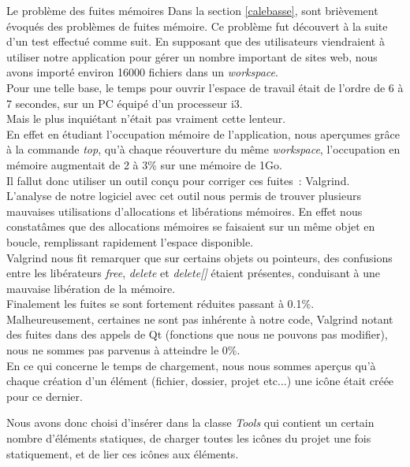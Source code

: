 \documentclass[a4paper, 12pt]{report}
\begin{document}
\begin{chapter}
	\begin{section}{Le problème des fuites mémoires}
		Dans la section \ref{calebasse}, sont brièvement évoqués des problèmes de fuites mémoire. Ce problème fut découvert à la suite
		d'un test effectué comme suit.
		En supposant que des utilisateurs viendraient à utiliser notre application pour gérer un nombre important de sites web, nous avons importé
		environ 16000 fichiers dans un \emph{workspace}.\\
		Pour une telle base, le temps pour ouvrir l'espace de travail était de l'ordre de 6 à 7 secondes, sur un PC équipé d'un processeur i3.\\
		Mais le plus inquiétant n'était pas vraiment cette lenteur.\\
		En effet en étudiant l'occupation mémoire de l'application, nous aperçumes grâce à la commande \emph{top}, qu'à chaque réouverture du même 
		\emph{workspace}, l'occupation en mémoire augmentait de 2 à 3\% sur une mémoire de 1Go.\\


		Il fallut donc utiliser un outil conçu pour corriger ces fuites : \gls{Valgrind}.\\
		L'analyse de notre logiciel avec cet outil nous permis de trouver plusieurs mauvaises utilisations d'allocations et libérations mémoires.
		En effet nous constatâmes que des allocations mémoires se faisaient sur  un même objet en boucle, remplissant rapidement l'espace
		disponible.\\
		\gls{Valgrind} nous fit remarquer que sur certains objets ou pointeurs, des confusions entre les libérateurs \emph{free}, \emph{delete} et
		\emph{delete[]} étaient présentes, conduisant à une mauvaise libération de la mémoire.\\


		Finalement les fuites se sont fortement réduites passant à 0.1\%.\\
		Malheureusement, certaines ne sont pas inhérente à notre code, \gls{Valgrind} notant des fuites dans des appels de \gls{Qt} (fonctions que 
		nous ne pouvons pas modifier), nous ne sommes pas parvenus à atteindre le 0\%.\\

		En ce qui concerne le temps de chargement, nous nous sommes aperçus qu'à chaque création d'un élément (fichier, dossier, projet etc...) une
		icône était créée pour ce dernier.

		Nous avons donc choisi d'insérer dans la classe \emph{Tools} qui contient un certain nombre d'éléments statiques, de charger toutes les
		icônes du projet une fois statiquement, et de lier ces icônes aux éléments.


\end{section}
\end{chapter}
\end{document}
